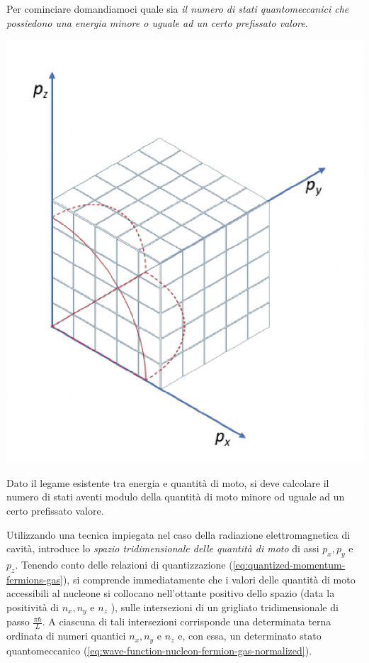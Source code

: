 Per cominciare domandiamoci quale sia \emph{il numero di stati quantomeccanici che possiedono una energia minore o uguale ad un certo prefissato valore}.
\begin{marginfigure}
	\includegraphics{figs/cube-fermion-gas2}
\end{marginfigure}
Dato il legame esistente tra energia e quantità di moto, si deve calcolare il numero di stati aventi modulo della quantità di moto minore od uguale ad un certo prefissato valore.

Utilizzando una tecnica impiegata nel caso della radiazione elettromagnetica di cavità, introduce lo \emph{spazio tridimensionale delle quantità di moto} di assi $p_{x}, p_{y}$ e $p_{z}$. Tenendo conto delle relazioni di quantizzazione (\ref{eq:quantized-momentum-fermions-gas}), si comprende immediatamente che i valori delle quantità di moto accessibili al nucleone si collocano nell’ottante positivo dello spazio (data la positività di $n_{x}, n_{y}$ e $n_{z}$ ), sulle intersezioni di un grigliato tridimensionale di passo $\frac{\pi \hbar}{L}$.
A ciascuna di tali intersezioni corrisponde una determinata terna ordinata di numeri quantici $n_{x}, n_{y}$ e $n_{z}$ e, con essa, un determinato stato quantomeccanico (\ref{eq:wave-function-nucleon-fermion-gas-normalized}).


